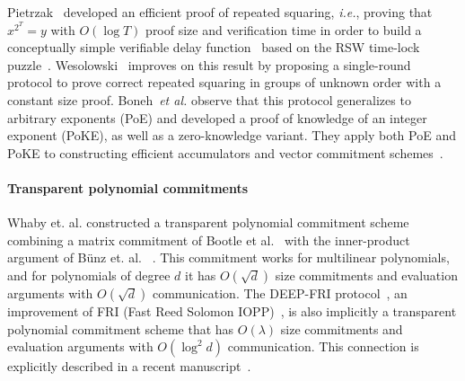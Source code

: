 Pietrzak~\cite{ITCS:Pietrzak18} developed an efficient proof of repeated squaring, \emph{i.e.}, proving that $x^{2^T} = y$ with $O(\log T)$ proof size and verification time in order to build a conceptually simple verifiable delay function~\cite{C:BBBF18} based on the RSW time-lock puzzle~\cite{RivShaWag96}. Wesolowski~\cite{EC:Wesolowski19} improves on this result by proposing a single-round protocol to prove correct repeated squaring in groups of unknown order with a constant size proof. Boneh~\emph{et al.} observe that this protocol generalizes to arbitrary exponents (PoE) and developed a proof of knowledge of an integer exponent (PoKE), as well as a zero-knowledge variant. They apply both PoE and PoKE to constructing efficient accumulators and vector commitment schemes~\cite{C:BonBunFis19}.

\paragraph{Transparent polynomial commitments} 
Whaby et. al. constructed a transparent polynomial commitment scheme combining a matrix commitment of Bootle et al.~\cite{EC:BCCGP16} with the inner-product argument of B\"{u}nz et. al. ~\cite{SP:BBBPWM18}. This commitment works for multilinear polynomials, and for polynomials of degree $d$ it has $O(\sqrt{d})$ size commitments and evaluation arguments with $O(\sqrt{d})$ communication. The DEEP-FRI protocol~\cite{ECCC:BGKS19}, an improvement of FRI (Fast Reed Solomon IOPP)~\cite{ICALP:BBHR18}, is also implicitly a transparent polynomial commitment scheme that has $O(\lambda)$ size commitments and evaluation arguments with $O(\log ^2 d)$ communication. This connection is explicitly described in a recent manuscript~\cite{MatterLabs}. 


